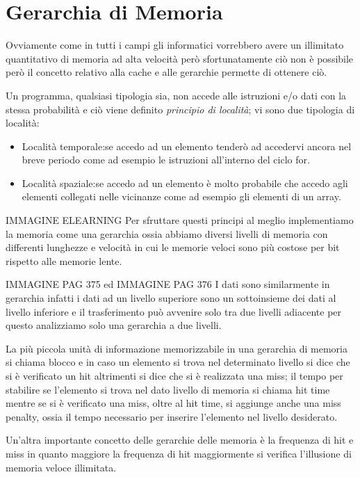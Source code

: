 \chapter{Gerarchia di Memoria}
Ovviamente come in tutti i campi gli informatici vorrebbero avere un illimitato
quantitativo di memoria ad alta velocità però sfortunatamente ciò non è possibile
però il concetto relativo alla cache e alle gerarchie permette di ottenere ciò.

Un programma, qualsiasi tipologia sia, non accede alle istruzioni e/o dati con
la stessa probabilità e ciò viene definito \emph{principio di località}; vi sono
due tipologia di località:
\begin{itemize}
  \item Località temporale:se accedo ad un elemento tenderò ad accedervi ancora nel
                           breve periodo come ad esempio le istruzioni all'interno del ciclo for.
  \item Località spaziale:se accedo ad un elemento è molto probabile che accedo agli
                          elementi collegati nelle vicinanze come ad esempio gli elementi di un array.
\end{itemize}

IMMAGINE ELEARNING
Per sfruttare questi principi al meglio implementiamo la memoria come una gerarchia
ossia abbiamo diversi livelli di memoria con differenti lunghezze e velocità in cui
le memorie veloci sono più costose per bit rispetto alle memorie lente.

IMMAGINE PAG 375 ed IMMAGINE PAG 376
I dati sono similarmente in gerarchia infatti i dati ad un livello superiore sono
un sottoinsieme dei dati al livello inferiore e il trasferimento può avvenire solo
tra due livelli adiacente per questo analizziamo solo una gerarchia a due livelli.

La più piccola unità di informazione memorizzabile in una gerarchia di memoria si
chiama blocco e in caso un elemento si trova nel determinato livello si dice che
si è verificato un hit altrimenti si dice che si è realizzata una miss;
il tempo per stabilire se l'elemento si trova nel dato livello di memoria si chiama
hit time mentre se si è verificato una miss, oltre al hit time, si aggiunge anche
una miss penalty, ossia il tempo necessario per inserire l'elemento nel livello desiderato.

Un'altra importante concetto delle gerarchie delle memoria è la frequenza di hit e miss
in quanto maggiore la frequenza di hit maggiormente si verifica l'illusione di memoria veloce illimitata.


